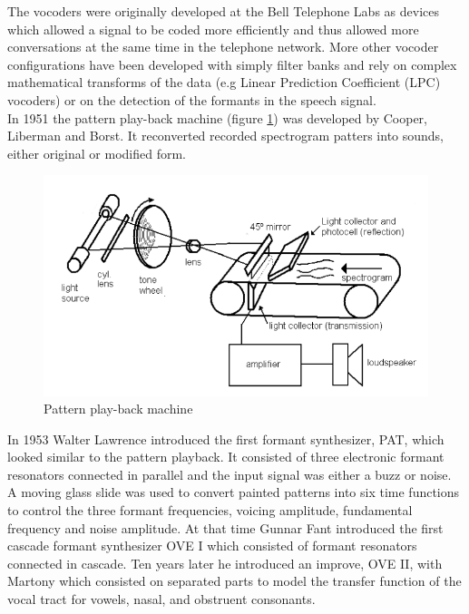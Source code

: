 The vocoders were originally developed at the Bell Telephone Labs as devices which allowed a signal to be coded more efficiently and thus allowed more conversations at the same time in the telephone network. More other vocoder configurations have been developed with simply filter banks and rely on complex mathematical transforms of the data (e.g Linear Prediction Coefficient (LPC) vocoders) or on the detection of the formants in the speech signal.\\
In 1951 the pattern play-back machine (figure \ref{spectro}) was developed by Cooper, Liberman and Borst. It reconverted recorded spectrogram patters into sounds, either original or modified form.\\
\begin{figure}[htb]
	\begin{center}
	\includegraphics[width=1\textwidth]{img/spectrogram.png}
	\end{center}
	\caption{\label{spectro}Pattern play-back machine \cite{history-images}}
\end{figure}
In 1953 Walter Lawrence introduced the first formant synthesizer, PAT, which looked similar to the pattern playback. It consisted of three electronic formant resonators connected in parallel and the input signal was either a buzz or noise. A moving glass slide was used to convert painted patterns into six time functions to control the three formant frequencies, voicing amplitude, fundamental frequency and noise amplitude. At that time Gunnar Fant introduced the first cascade formant synthesizer OVE I which consisted of formant resonators connected in cascade. Ten years later he introduced an improve, OVE II, with Martony which consisted on separated parts to model the transfer function of the vocal tract for vowels, nasal, and obstruent consonants.\\
